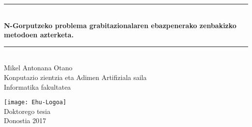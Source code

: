 \begin{titlepage}
\newcommand{\HRule}{\rule{\linewidth}{0.5mm}}
\begin{center}
\HRule \\[0.4cm]
{ \Large \bfseries \sc N-Gorputzeko problema grabitazionalaren ebazpenerako zenbakizko metodoen azterketa.}\\[0.4cm]

\HRule \\[1cm]
{\Large Mikel Antonana Otano}
\\[.75cm]


{\large Konputazio zientzia eta Adimen Artifiziala saila \\[.1cm]
}
{\large Informatika fakultatea \\[2.cm]
}


\texttt{[image: Ehu-Logoa]}
\\[5cm]

{\large Doktorego tesia\\[.1cm]}
{\large Donostia 2017}




\end{center}
\end{titlepage}\pagebreak